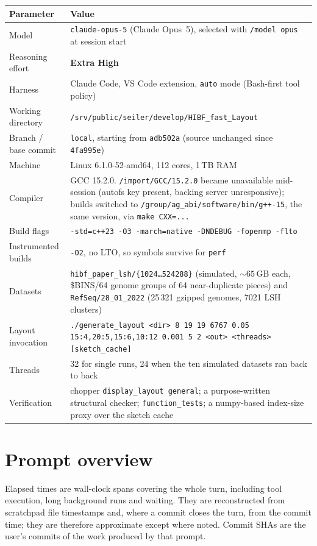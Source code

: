 \documentclass[11pt,a4paper]{article}
\newcommand{\sha}[1]{\texttt{#1}}
\begin{document}
\begin{longtable}{@{}p{5.0cm}p{10.6cm}@{}}
\toprule
\textbf{Parameter} & \textbf{Value} \\
\midrule
\endhead
Model & \texttt{claude-opus-5} (Claude Opus~5), selected with \texttt{/model opus} at
  session start \\
Reasoning effort & \textbf{Extra High} \\
Harness & Claude Code, VS Code extension, \texttt{auto} mode (Bash-first tool policy) \\
Working directory & \texttt{/srv/public/seiler/develop/HIBF\_fast\_Layout} \\
Branch / base commit & \texttt{local}, starting from \sha{adb502a} (source unchanged since
  \sha{4fa995e}) \\
Machine & Linux 6.1.0-52-amd64, 112 cores, 1\,TB RAM \\
Compiler & GCC 15.2.0. \texttt{/import/GCC/15.2.0} became unavailable mid-session (autofs key
  present, backing server unresponsive); builds switched to
  \texttt{/group/ag\_abi/software/bin/g++-15}, the same version, via
  \texttt{make CXX=...} \\
Build flags & \texttt{-std=c++23 -O3 -march=native -DNDEBUG -fopenmp -flto} \\
Instrumented builds & \texttt{-O2}, no LTO, so symbols survive for \texttt{perf} \\
Datasets & \texttt{hibf\_paper\_lsh/\{1024\ldots524288\}} (simulated, ${\sim}65$\,GB each,
  \$BINS/64 genome groups of 64 near-duplicate pieces) and
  \texttt{RefSeq/28\_01\_2022} (25\,321 gzipped genomes, 7021 LSH clusters) \\
Layout invocation & \texttt{./generate\_layout <dir> 8 19 19 6767 0.05
  15:4,20:5,15:6,10:12 0.001 5 2 <out> <threads> [sketch\_cache]} \\
Threads & 32 for single runs, 24 when the ten simulated datasets ran back to back \\
Verification & chopper \texttt{display\_layout general}; a purpose-written structural checker;
  \texttt{function\_tests}; a numpy-based index-size proxy over the sketch cache \\
\bottomrule
\end{longtable}

\section{Prompt overview}

Elapsed times are wall-clock spans covering the whole turn, including tool execution, long
background runs and waiting. They are reconstructed from scratchpad file timestamps and, where a
commit closes the turn, from the commit time; they are therefore approximate except where noted.
Commit SHAs are the user's commits of the work produced by that prompt.
\end{document}
